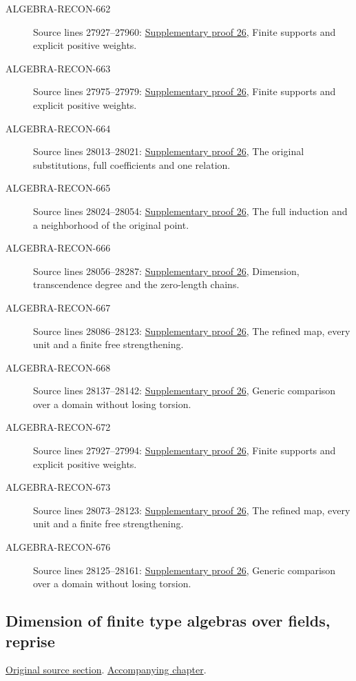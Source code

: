 \begin{description}
\item[ALGEBRA-RECON-662] Source lines 27927--27960: \hyperlink{algebra_noether_dimension_notes_20260928}{Supplementary proof 26}, Finite supports and explicit positive weights.
\item[ALGEBRA-RECON-663] Source lines 27975--27979: \hyperlink{algebra_noether_dimension_notes_20260928}{Supplementary proof 26}, Finite supports and explicit positive weights.
\item[ALGEBRA-RECON-664] Source lines 28013--28021: \hyperlink{algebra_noether_dimension_notes_20260928}{Supplementary proof 26}, The original substitutions, full coefficients and one relation.
\item[ALGEBRA-RECON-665] Source lines 28024--28054: \hyperlink{algebra_noether_dimension_notes_20260928}{Supplementary proof 26}, The full induction and a neighborhood of the original point.
\item[ALGEBRA-RECON-666] Source lines 28056--28287: \hyperlink{algebra_noether_dimension_notes_20260928}{Supplementary proof 26}, Dimension, transcendence degree and the zero-length chains.
\item[ALGEBRA-RECON-667] Source lines 28086--28123: \hyperlink{algebra_noether_dimension_notes_20260928}{Supplementary proof 26}, The refined map, every unit and a finite free strengthening.
\item[ALGEBRA-RECON-668] Source lines 28137--28142: \hyperlink{algebra_noether_dimension_notes_20260928}{Supplementary proof 26}, Generic comparison over a domain without losing torsion.
\item[ALGEBRA-RECON-672] Source lines 27927--27994: \hyperlink{algebra_noether_dimension_notes_20260928}{Supplementary proof 26}, Finite supports and explicit positive weights.
\item[ALGEBRA-RECON-673] Source lines 28073--28123: \hyperlink{algebra_noether_dimension_notes_20260928}{Supplementary proof 26}, The refined map, every unit and a finite free strengthening.
\item[ALGEBRA-RECON-676] Source lines 28125--28161: \hyperlink{algebra_noether_dimension_notes_20260928}{Supplementary proof 26}, Generic comparison over a domain without losing torsion.
\end{description}

\subsection{Dimension of finite type algebras over fields, reprise}
\hypertarget{algebra-source-section-dimension-finite-type-algebras-reprise}{}
\noindent\href{https://github.com/stacks/stacks-project/blob/a04446e57ec1fbc252a871afcec7752fb2807b14/algebra.tex\#L28167}{Original source section}. \href{algebra.pdf\#nameddest=section-dimension-finite-type-algebras-reprise}{Accompanying chapter}.


